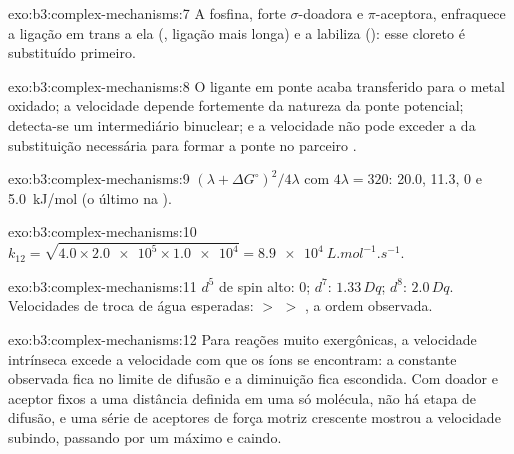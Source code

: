 \begin{solution}{exo:b3:complex-mechanisms:7}
A fosfina, forte $\sigma$-doadora e $\pi$-aceptora, enfraquece a ligação em trans a ela (, ligação mais longa) e a labiliza (): esse cloreto é
substituído primeiro.
\end{solution}

\begin{solution}{exo:b3:complex-mechanisms:8}
O ligante em ponte acaba transferido para o metal oxidado; a velocidade depende
fortemente da natureza da ponte potencial; detecta-se um intermediário binuclear;
e a velocidade não pode exceder a da substituição necessária para formar a
ponte no parceiro .
\end{solution}

\begin{solution}{exo:b3:complex-mechanisms:9}
$(\lambda + \Delta G^\circ)^2/4\lambda$ com $4\lambda = 320$: 20.0, 11.3, 0 e \qty{5.0}{kJ/mol} (o último na ).
\end{solution}

\begin{solution}{exo:b3:complex-mechanisms:10}
$k_{12} = \sqrt{4.0 \times \num{2.0e5} \times \num{1.0e4}} = \qty{8.9e4}{L.mol^{-1}.s^{-1}}$.
\end{solution}

\begin{solution}{exo:b3:complex-mechanisms:11}
$d^5$ de spin alto: 0; $d^7$: $1.33\,Dq$; $d^8$: $2.0\,Dq$. Velocidades de troca de água esperadas:  $>$  $>$
, a ordem observada.
\end{solution}

\begin{solution}{exo:b3:complex-mechanisms:12}
Para reações muito exergônicas, a velocidade intrínseca excede a velocidade com que os íons
se encontram: a constante observada fica no limite de difusão e a diminuição fica
escondida. Com doador e aceptor fixos a uma distância definida em uma só molécula, não
há etapa de difusão, e uma série de aceptores de força motriz crescente
mostrou a velocidade subindo, passando por um máximo e caindo.
\end{solution}

